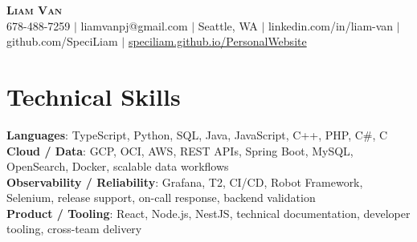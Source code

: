\documentclass[letterpaper,11pt]{article}
\begin{document}

%
\begin{center}
    \textbf{\Huge \scshape Liam Van} \\ \vspace{1pt}
    \small 678-488-7259 $|$ \small {liamvanpj@gmail.com} $|$ Seattle, WA
 {{$|$ linkedin.com/in/liam-van} {$|$ github.com/SpeciLiam} {$|$ \href{https://speciliam.github.io/PersonalWebsite}{speciliam.github.io/PersonalWebsite}}}

\end{center}

\section{Technical Skills}
 \begin{itemize}[leftmargin=0.15in, label={}]
    \small{\item{
     \textbf{Languages}{: TypeScript, Python, SQL, Java, JavaScript, C++, PHP, C\#, C} \\
     \textbf{Cloud / Data}{: GCP, OCI, AWS, REST APIs, Spring Boot, MySQL, OpenSearch, Docker, scalable data workflows} \\
     \textbf{Observability / Reliability}{: Grafana, T2, CI/CD, Robot Framework, Selenium, release support, on-call response, backend validation} \\
     \textbf{Product / Tooling}{: React, Node.js, NestJS, technical documentation, developer tooling, cross-team delivery} \\
    }}
 \end{itemize}
%
\end{document}
